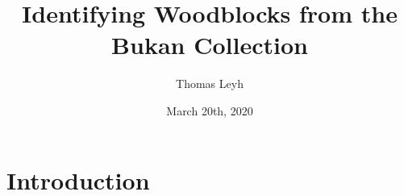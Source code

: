 \documentclass{scrreprt}
\title{Identifying Woodblocks from the Bukan Collection}
\author{Thomas Leyh}
\date{March 20th, 2020}
\begin{document}
\maketitle

\tableofcontents

\chapter{Introduction}
\end{document}
